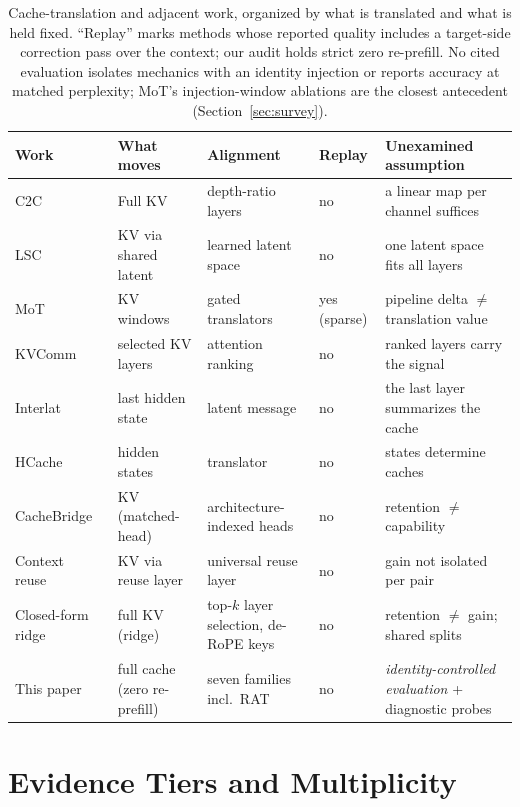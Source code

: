 \documentclass{article} %
\begin{document}
\begin{table}[t]
\centering
\small
\caption{Cache-translation and adjacent work, organized by what is
translated and what is held fixed. ``Replay'' marks methods whose reported
quality includes a target-side correction pass over the context; our audit
holds strict zero re-prefill. No cited evaluation isolates mechanics with an
identity injection or reports accuracy at matched perplexity; MoT's
injection-window ablations are the closest antecedent
(Section~\ref{sec:survey}).}
\label{tab:related}
\setlength{\tabcolsep}{4pt}
\begin{tabular}{p{2.6cm}p{2.2cm}p{2.4cm}p{1.6cm}p{3.2cm}}
\toprule
Work & What moves & Alignment & Replay & Unexamined assumption \\
\midrule
C2C~\citep{c2c2025} & Full KV & depth-ratio layers & no & a linear map per
channel suffices \\
LSC~\citep{lsc2026} & KV via shared latent & learned latent space & no &
one latent space fits all layers \\
MoT~\citep{mot2026} & KV windows & gated translators & yes (sparse) &
pipeline delta $\neq$ translation value \\
KVComm~\citep{kvcomm2025} & selected KV layers & attention ranking & no &
ranked layers carry the signal \\
Interlat~\citep{interlat2025} & last hidden state & latent message & no &
the last layer summarizes the cache \\
HCache~\citep{hcache2025} & hidden states & translator & no & states
determine caches \\
CacheBridge~\citep{cachebridge2026} & KV (matched-head) & architecture-indexed heads & no & retention $\neq$ capability \\
Context reuse~\citep{contextreuse2026} & KV via reuse layer & universal reuse layer & no & gain not isolated per pair \\
\midrule
Closed-form ridge~\citep{heo2026} & full KV (ridge) & top-$k$ layer selection, de-RoPE
keys & no & retention $\neq$ gain; shared splits \\
\midrule
This paper & full cache (zero re-prefill) & seven families incl.\ RAT & no &
\emph{identity-controlled evaluation} + diagnostic probes \\
\bottomrule
\end{tabular}
\end{table}

\section{Evidence Tiers and Multiplicity}
\label{app:tiers}
\end{document}
